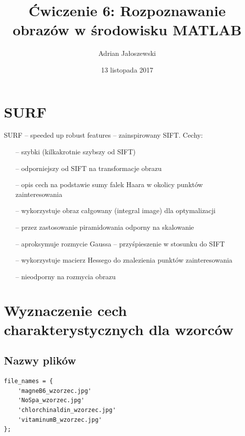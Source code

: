 \documentclass[a4paper, 12pt, titlepage]{article}
\author{Adrian Jałoszewski}
\title{Ćwiczenie 6: Rozpoznawanie obrazów w środowisku MATLAB}
\date{13 listopada 2017}
\begin{document}
    \maketitle
    \section{SURF} 
        SURF -- speeded up robust features -- zainspirowany SIFT.  Cechy:
        \begin{itemize}
            \item[--] szybki (kilkakrotnie szybszy od SIFT)
            \item[--] odporniejszy od SIFT na transformacje obrazu
            \item[--] opis cech na podstawie sumy falek Haara w okolicy
                punktów zainteresowania
            \item[--] wykorzystuje obraz całgowany (integral image) dla
                optymalizacji
            \item[--] przez zastosowanie piramidowania odporny na skalowanie
            \item[--] aproksymuje rozmycie Gaussa -- przyśpieszenie w stosunku
                do SIFT
            \item[--] wykorzystuje macierz Hessego do znalezienia punktów 
                zainteresowania
            \item[--] nieodporny na rozmycia obrazu
        \end{itemize}
    \section{Wyznaczenie cech charakterystycznych dla wzorców}
        \subsection{Nazwy plików}
\begin{lstlisting}
file_names = { 
    'magneB6_wzorzec.jpg'
    'NoSpa_wzorzec.jpg'
    'chlorchinaldin_wzorzec.jpg'
    'vitaminumB_wzorzec.jpg'
};
\end{lstlisting}
\end{document}
